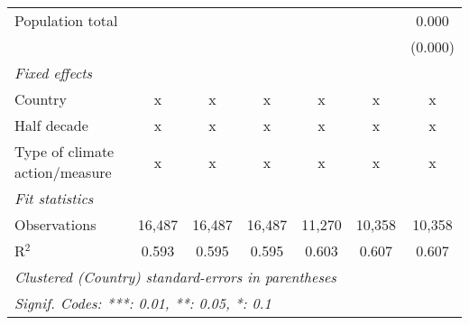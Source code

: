 \begin{tabular}{lcccccc}
   Population total                                                      &         &                &                &                &                & 0.000\\   
                                                                         &         &                &                &                &                & (0.000)\\   
   \emph{Fixed effects}\\
   Country                                                               & x       & x              & x              & x              & x              & x\\  
   Half decade                                                           & x       & x              & x              & x              & x              & x\\  
   Type of climate action/measure                                        & x       & x              & x              & x              & x              & x\\  
   \midrule \emph{Fit statistics}\\
   Observations                                                          & 16,487  & 16,487         & 16,487         & 11,270         & 10,358         & 10,358\\  
   R$^2$                                                                 & 0.593   & 0.595          & 0.595          & 0.603          & 0.607          & 0.607\\  
   \midrule
   \multicolumn{7}{l}{\emph{Clustered (Country) standard-errors in parentheses}}\\
   \multicolumn{7}{l}{\emph{Signif. Codes: ***: 0.01, **: 0.05, *: 0.1}}\\
\end{tabular}
\par\endgroup


